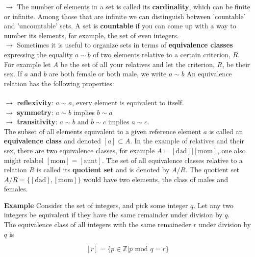 \documentclass[11pt, oneside]{article}   	%
\begin{document}
$\rightarrow$ The number of elements in a set is called its \textbf{cardinality}, which can be finite or infinite. Among those that are infinite we can distinguish between 'countable' and 'uncountable' sets. A set is \textbf{countable} if you can come up with a way to number its elements, for example, the set of even integers. \\

$\rightarrow$ Sometimes it is useful to organize sets in terms of \textbf{equivalence classes} expressing the equality $a \sim b$ of two elements relative to a certain criterion, $R$. For example let $A$ be the set of all your relatives and let the criterion, $R$, be their sex. If $a$ and $b$ are both female or both male, we write $a \sim b$ An equivalence relation has the following properties: \\\\
\hspace{20px} $\rightarrow$ \textbf{reflexivity}: $a \sim a$, every element is equivalent to itself. \\
\hspace{20px}$\rightarrow$ \textbf{symmetry}: $a \sim b$ implies $b \sim a$ \\ 
\hspace{20px} $\rightarrow$ \textbf{transitivity}: $a \sim b$ and $b \sim c$ implies $a \sim c$. \\

The subset of all elements equivalent to a given reference element $a$ is called an \textbf{equivalence class} and denoted $[a] \subset A$. In the example of relatives and their sex, there are two equivalence classes, for example $A = [\text{dad}] | [\text{mom}]$, one also might relabel $[\text{mom}] = [\text{aunt}]$. The set of all equivalence classes relative to a relation $R$ is called its \textbf{quotient set} and is denoted by $A/R$. The quotient set $A/R = \{[\text{dad}], [\text{mom}]\}$ would have two elements, the class of males and females. \\

\vspace{20px}

\textbf{Example} Consider the set of integers, and pick some integer $q$. Let any two integers be equivalent if they have the same remainder under division by $q$. \\

The equivalence class of all integers with the same remaineder $r$ under division by $q$ is 

\[ [r] = \{ p \in \mathbb{Z} | p \text{ mod } q = r\} \]
\end{document}
